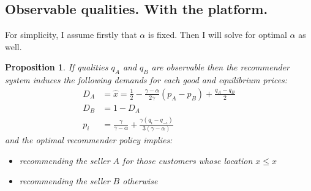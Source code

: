 \documentclass[a4paper]{article}
\newtheorem{proposition}[theorem]{Proposition}
\begin{document}
	\subsection{Observable qualities. With the platform.}
	For simplicity, I assume firstly that $\alpha$ is fixed. Then I will solve for optimal $\alpha$ as well.
	\begin{proposition} \label{with}
		If qualities $q_A$ and $q_B$ are observable then the recommender system induces the following demands for each good and equilibrium prices:
		\begin{align*}
		D_A &= \hat{x} = \frac{1}{2} - \frac{\gamma-\alpha}{2 \gamma}(p_A - p_B) + \frac{q_A - q_B}{2}\\
		D_B &= 1 - D_A\\
		p_i &= \frac{\gamma}{\gamma - \alpha} + \frac{\gamma(q_{i} -q_{-i})}{3(\gamma-\alpha)}
		\end{align*}
		and the optimal recommender policy implies:
		\begin{itemize}
			\item recommending the seller $A$ for those customers whose location $x \le \hat{x}$
			\item recommending the seller $B$ otherwise
		\end{itemize}
	\end{proposition}
\end{document}
